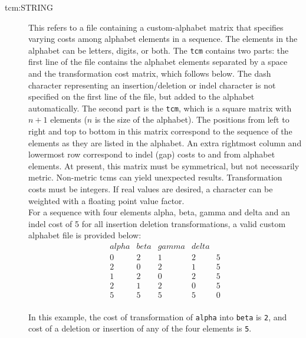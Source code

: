 \begin{description}
		\item [tcm:STRING] This refers to a file containing a custom-alphabet matrix that specifies varying 
		costs among alphabet elements in a sequence. The elements in the alphabet can be letters, 
		digits, or both.
		The \texttt{tcm} contains two parts: the first line of the file contains the alphabet elements 
		separated by a space and the transformation cost matrix, which follows below. The dash 
		character representing an insertion/deletion or indel character is not specified on the first 
		line of the file, but added to the alphabet automatically. The second part is the \texttt{tcm}, 
		which is a square matrix with $n + 1$ elements ($n$ is the size of the alphabet). 
		The positions from left to right and top to bottom in this matrix correspond to the sequence 
		of the elements as they are listed in the alphabet. An extra rightmost column and lowermost
		row correspond to indel (gap) costs to and from alphabet elements. At present, this matrix 
		must be symmetrical, but not necessarily metric. Non-metric tcms can yield unexpected 
		results. Transformation costs must be integers. If real values are desired, a character can 
		be weighted with a floating point value factor. \\
		
		For a sequence with four elements alpha, beta, gamma and delta and an indel cost of 5 
		for all insertion deletion transformations, a valid custom alphabet file is provided below:
		\\
		\begin{equation*}
		\begin{array}{lllll}
		alpha & beta & gamma & delta &  \\
		0 &   2 &  1 &   2 &   5 \\
		2 &   0 &  2 &   1 &   5 \\
		1 &   2 &  0 &   2 &   5 \\
		2 &   1 &  2 &   0 &   5 \\
		5 &   5 &  5 &   5 &   0
		\end{array}
		\end{equation*} 
		\\
		In this example, the cost of transformation of \texttt{alpha} into \texttt{beta} is \texttt{2},
		and cost of a deletion or insertion of any of the four elements is \texttt{5}.


\end{description}
